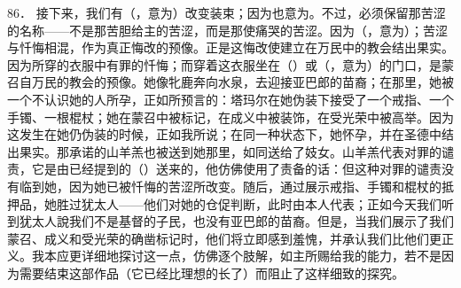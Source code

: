 86． 接下来，我们有（，意为）改变装束；因为也意为。不过，必须保留那苦涩的名称——不是那苦胆给主的苦涩，而是那使痛哭的苦涩。因为（，意为）；苦涩与忏悔相混，作为真正悔改的预像。正是这悔改使建立在万民中的教会结出果实。因为所穿的衣服中有罪的忏悔；而穿着这衣服坐在（）或（，意为）的门口，是蒙召自万民的教会的预像。她像牝鹿奔向水泉，去迎接亚巴郎的苗裔；在那里，她被一个不认识她的人所孕，正如所预言的：塔玛尔在她伪装下接受了一个戒指、一个手镯、一根棍杖；她在蒙召中被标记，在成义中被装饰，在受光荣中被高举。因为这发生在她仍伪装的时候，正如我所说；在同一种状态下，她怀孕，并在圣德中结出果实。那承诺的山羊羔也被送到她那里，如同送给了妓女。山羊羔代表对罪的谴责，它是由已经提到的（）送来的，他仿佛使用了责备的话：但这种对罪的谴责没有临到她，因为她已被忏悔的苦涩所改变。随后，通过展示戒指、手镯和棍杖的抵押品，她胜过犹太人——他们对她的仓促判断，此时由本人代表；正如今天我们听到犹太人說我们不是基督的子民，也没有亚巴郎的苗裔。但是，当我们展示了我们蒙召、成义和受光荣的确凿标记时，他们将立即感到羞愧，并承认我们比他们更正义。我本应更详细地探讨这一点，仿佛逐个肢解，如主所赐给我的能力，若不是因为需要结束这部作品（它已经比理想的长了）而阻止了这样细致的探究。\par


